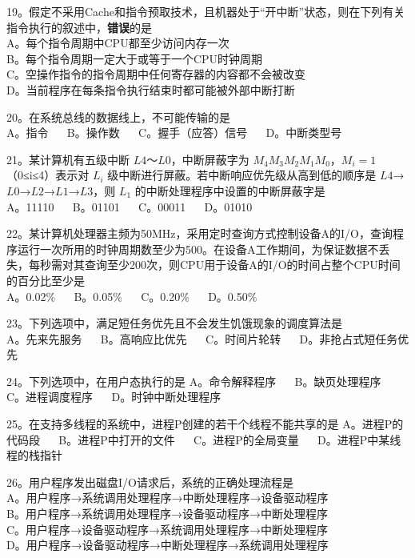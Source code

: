19。假定不采用Cache和指令预取技术，且机器处于“开中断”状态，则在下列有关指令执行的叙述中，\textbf{错误}的是 \\
A。每个指令周期中CPU都至少访问内存一次 \\
B。每个指令周期一定大于或等于一个CPU时钟周期 \\
C。空操作指令的指令周期中任何寄存器的内容都不会被改变 \\
D。当前程序在每条指令执行结束时都可能被外部中断打断

20。在系统总线的数据线上，不可能传输的是 \\
A。指令 $\quad$ B。操作数 $\quad$ C。握手（应答）信号 $\quad$ D。中断类型号

21。某计算机有五级中断 $L4$～$L0$，中断屏蔽字为 $M_4M_3M_2M_1M_0$，$M_i=1$（0≤i≤4）表示对 $L_i$ 级中断进行屏蔽。若中断响应优先级从高到低的顺序是 $L4$→$L0$→$L2$→$L1$→$L3$，则 $L_1$ 的中断处理程序中设置的中断屏蔽字是 \\
A。11110 $\quad$ B。01101 $\quad$ C。00011 $\quad$ D。01010

22。某计算机处理器主频为50MHz，采用定时查询方式控制设备A的I/O，查询程序运行一次所用的时钟周期数至少为500。在设备A工作期间，为保证数据不丢失，每秒需对其查询至少200次，则CPU用于设备A的I/O的时间占整个CPU时间的百分比至少是 \\
A。0.02\%  $\quad$ B。0.05\%  $\quad$ C。0.20\%  $\quad$ D。0.50\%

23。下列选项中，满足短任务优先且不会发生饥饿现象的调度算法是 \\
A。先来先服务 $\quad$ B。高响应比优先 $\quad$ C。时间片轮转 $\quad$ D。非抢占式短任务优先

24。下列选项中，在用户态执行的是
A。命令解释程序 $\quad$ B。缺页处理程序 $\quad$ C。进程调度程序 $\quad$ D。时钟中断处理程序

25。在支持多线程的系统中，进程P创建的若干个线程不能共享的是
A。进程P的代码段 $\quad$ B。进程P中打开的文件 $\quad$ C。进程P的全局变量 $\quad$ D。进程P中某线程的栈指针

26。用户程序发出磁盘I/O请求后，系统的正确处理流程是 \\
A。用户程序→系统调用处理程序→中断处理程序→设备驱动程序 \\
B。用户程序→系统调用处理程序→设备驱动程序→中断处理程序 \\
C。用户程序→设备驱动程序→系统调用处理程序→中断处理程序 \\
D。用户程序→设备驱动程序→中断处理程序→系统调用处理程序

